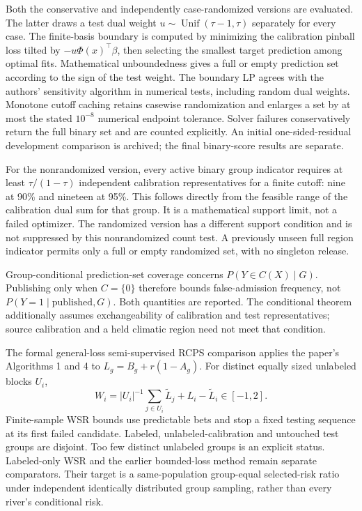 \documentclass[draft]{agujournal2025}
\begin{document}
Both the conservative and independently case-randomized versions are evaluated. The latter draws a test dual weight $u\sim\operatorname{Unif}(\tau-1,\tau)$ separately for every case. The finite-basis boundary is computed by minimizing the calibration pinball loss tilted by $-u\Phi(x)^\top\beta$, then selecting the smallest target prediction among optimal fits. Mathematical unboundedness gives a full or empty prediction set according to the sign of the test weight. The boundary LP agrees with the authors' sensitivity algorithm in numerical tests, including random dual weights. Monotone cutoff caching retains casewise randomization and enlarges a set by at most the stated $10^{-8}$ numerical endpoint tolerance. Solver failures conservatively return the full binary set and are counted explicitly. An initial one-sided-residual development comparison is archived; the final binary-score results are separate.

For the nonrandomized version, every active binary group indicator requires at least $\tau/(1-\tau)$ independent calibration representatives for a finite cutoff: nine at 90\% and nineteen at 95\%. This follows directly from the feasible range of the calibration dual sum for that group. It is a mathematical support limit, not a failed optimizer. The randomized version has a different support condition and is not suppressed by this nonrandomized count test. A previously unseen full region indicator permits only a full or empty randomized set, with no singleton release.

Group-conditional prediction-set coverage concerns $P(Y\in C(X)\mid G)$. Publishing only when $C=\{0\}$ therefore bounds false-admission frequency, not $P(Y=1\mid\text{published},G)$. Both quantities are reported. The conditional theorem additionally assumes exchangeability of calibration and test representatives; source calibration and a held climatic region need not meet that condition.

The formal general-loss semi-supervised RCPS comparison applies the paper's Algorithms 1 and 4 to $L_g=B_g+r(1-A_g)$. For distinct equally sized unlabeled blocks $U_i$,
\[
 W_i=|U_i|^{-1}\sum_{j\in U_i}\widetilde L_j+L_i-\widetilde L_i\in[-1,2].
\]
Finite-sample WSR bounds use predictable bets and stop a fixed testing sequence at its first failed candidate. Labeled, unlabeled-calibration and untouched test groups are disjoint. Too few distinct unlabeled groups is an explicit status. Labeled-only WSR and the earlier bounded-loss method remain separate comparators. Their target is a same-population group-equal selected-risk ratio under independent identically distributed group sampling, rather than every river's conditional risk.
\end{document}
